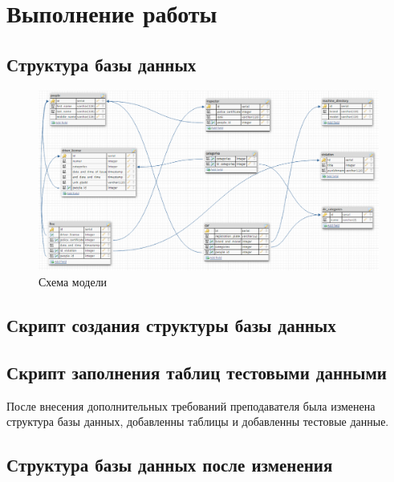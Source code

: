 \section{Выполнение работы}

\subsection{Структура базы данных}

\begin{figure}[H]
	\begin{center}
		\includegraphics[scale=0.6]{../../diagram/diagram.png}
		\caption{Схема модели} 
		\label{pic:pic_name} %
	\end{center}
\end{figure}

\subsection{Скрипт создания структуры базы данных}



\subsection{Скрипт заполнения таблиц тестовыми данными}



После внесения дополнительных требований преподавателя была изменена структура базы данных, добавленны таблицы и добавленны тестовые данные.

\subsection{Структура базы данных после изменения}


